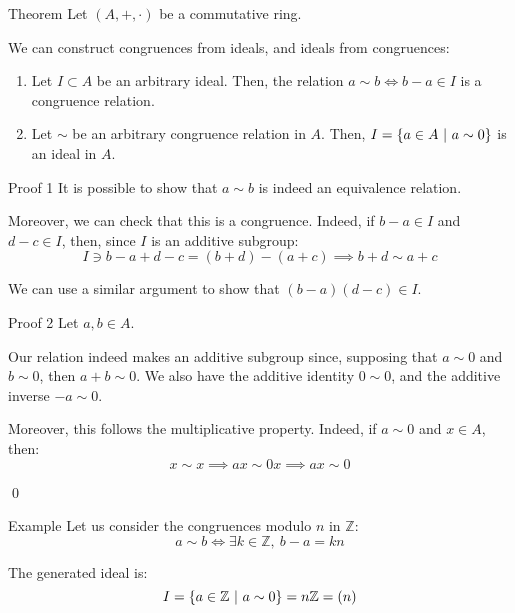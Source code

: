 \documentclass[a4paper]{article}
\begin{document}
\begin{parag}{Theorem}
    Let $\left(A, +, \cdot \right)$ be a commutative ring.

    We can construct congruences from ideals, and ideals from congruences:
    \begin{enumerate}
        \item Let $I \subset A$ be an arbitrary ideal. Then, the relation $a \sim b \iff b -a \in I$ is a congruence relation.
        \item Let $\sim$ be an arbitrary congruence relation in $A$. Then, $I = \left\{a \in A \suchthat a \sim 0\right\}$ is an ideal in $A$.
    \end{enumerate}
    
    \begin{subparag}{Proof 1}
        It is possible to show that $a \sim b$ is indeed an equivalence relation.

        Moreover, we can check that this is a congruence. Indeed, if $b-a \in I$ and $d - c \in I$, then, since $I$ is an additive subgroup: 
        \[I \ni b-a + d -c = \left(b+d\right) - \left(a + c\right) \implies b+d \sim a + c\]
        
        We can use a similar argument to show that $\left(b-a\right)\left(d - c\right) \in I$.
    \end{subparag}

    \begin{subparag}{Proof 2}
        Let $a, b \in A$. 

        Our relation indeed makes an additive subgroup since, supposing that $a \sim 0$ and $b\sim0$, then $a + b \sim 0 $. We also have the additive identity $0 \sim 0$, and the additive inverse $-a \sim 0$.

        Moreover, this follows the multiplicative property. Indeed, if $a \sim 0$ and $x \in A$, then: 
        \[x \sim x \implies ax \sim 0x \implies ax \sim 0 \]

        \qed
    \end{subparag}
\end{parag}

\begin{parag}{Example}
    Let us consider the congruences modulo $n$ in $\mathbb{Z}$: 
    \[a \sim b \iff \exists k \in \mathbb{Z},\ b-a = kn\]
    
    The generated ideal is: 
    \[I = \left\{a \in \mathbb{Z} \suchthat a \sim 0\right\} = n\mathbb{Z} = \left(n\right)\]
\end{parag}
\end{document}
